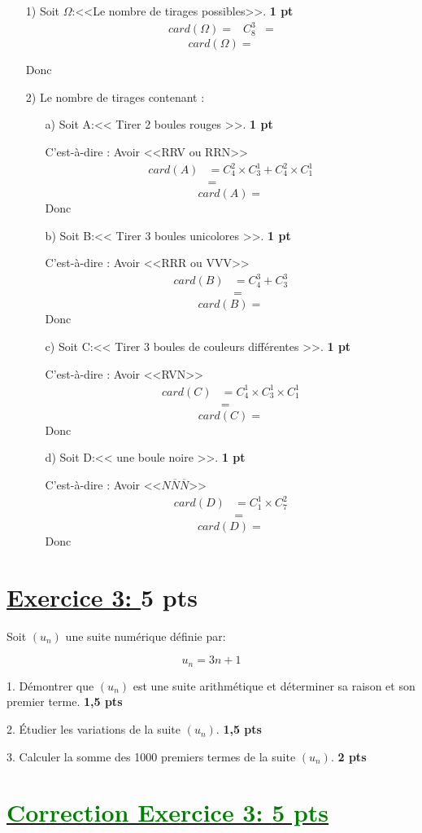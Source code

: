 \documentclass[12pt]{article}
\begin{document}
\begin{itemize}
\item[1)] Soit $\Omega$:<<Le nombre de tirages possibles>>. \textbf{1 pt}
\begin{align*}
card(\Omega)=&C_{8}^{3}
		&=	
\end{align*}
\[card(\Omega)=\]

Donc \textcolor{green}{}
\item[2)] Le nombre de tirages contenant :
\begin{itemize}
\item[a)] Soit A:<< Tirer 2 boules rouges >>. \textbf{1 pt}

C'est-à-dire : Avoir <<RRV ou RRN>>
\begin{align*}
card(A)&=C_{4}^{2}\times C_{3}^{1}+C_{4}^{2}\times C_{1}^{1}\\
		&=
\end{align*}
\[card(A)=\]
Donc \textcolor{green}{}
\item[b)] Soit B:<< Tirer 3 boules unicolores >>. \textbf{1 pt}

C'est-à-dire : Avoir <<RRR ou VVV>>
\begin{align*}
card(B)&=C_{4}^{3}+C_{3}^{3}\\
	&=
\end{align*}
\[card(B)=\]
Donc \textcolor{green}{}
\item[c)] Soit C:<< Tirer 3 boules de couleurs différentes >>. \textbf{1 pt}

C'est-à-dire : Avoir <<RVN>>
\begin{align*}
card(C)&=C_{4}^{1} \times C_{3}^{1} \times C_{1}^{1}\\
		&=
\end{align*}
\[card(C)=\]
Donc \textcolor{green}{}
\item[d)] Soit D:<< une boule noire >>. \textbf{1 pt}

C'est-à-dire : Avoir <<$N\overline{N}\overline{N}$>>
\begin{align*}
card(D)&=C_{1}^{1} \times C_{7}^{2}\\
		&=
\end{align*}
\[card(D)=\]
Donc \textcolor{green}{}
\end{itemize}
\end{itemize}
\section*{\underline{Exercice 3: }\textbf{5 pts}}
Soit $(u_n)$ une suite numérique définie par:

\[ u_n = 3n + 1 \]

1. Démontrer que $(u_n)$ est une suite arithmétique et déterminer sa raison et son premier terme. \textbf{1,5 pts}

2. Étudier les variations de la suite $(u_n)$. \textbf{1,5 pts}

3. Calculer la somme des 1000 premiers termes de la suite $(u_n)$. \textbf{2 pts}

\section*{\underline{\textcolor{green}{Correction Exercice 3: \textbf{5 pts}}}}
\end{document}
